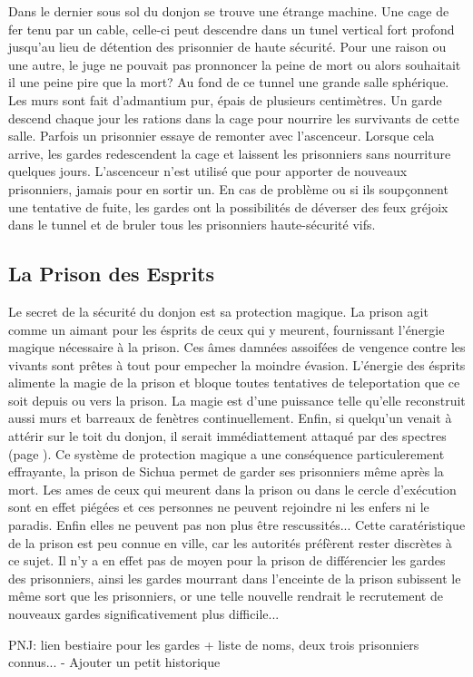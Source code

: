 Dans le dernier sous sol du donjon se trouve une étrange machine. Une cage de fer tenu 
par un cable, celle-ci peut descendre dans un tunel vertical fort profond
jusqu'au lieu de détention des prisonnier de haute sécurité. Pour une 
raison ou une autre, le juge ne pouvait pas pronnoncer la peine de mort
ou alors souhaitait il une peine pire que la mort? Au fond de ce tunnel une grande
salle sphérique. Les murs sont fait d'admantium pur, épais de plusieurs 
centimètres. Un garde descend chaque jour les rations dans la cage pour nourrire les 
survivants de cette salle. Parfois un prisonnier 
essaye de remonter avec l'ascenceur. Lorsque cela arrive, les gardes redescendent la cage et 
laissent les prisonniers sans nourriture quelques jours. L'ascenceur n'est utilisé
que pour apporter de nouveaux prisonniers, jamais pour en sortir un. En cas de
problème ou si ils soupçonnent une tentative de fuite, les gardes ont la possibilités 
de déverser des feux gréjoix dans le tunnel et de bruler tous les prisonniers 
haute-sécurité vifs.

\subsection{La Prison des Esprits}

Le secret de la sécurité du donjon est sa protection magique. La prison
agit comme un aimant pour les ésprits de ceux qui y meurent, fournissant
l'énergie magique nécessaire à la prison. Ces âmes damnées assoifées de vengence
contre les vivants sont prêtes à tout 
pour empecher la moindre évasion. L'énergie des ésprits alimente la magie de 
la prison et bloque toutes 
tentatives de teleportation que ce soit depuis ou vers la prison. La magie est d'une
puissance telle qu'elle reconstruit aussi murs et barreaux de fenètres
continuellement. Enfin, si quelqu'un venait à attérir sur le toit du donjon, il 
serait immédiattement attaqué par des spectres (page \pageref{Spectre}).
Ce système de protection magique a une conséquence particulerement effrayante,
la prison de Sichua permet de garder ses prisonniers même après la mort.
Les ames de
ceux qui meurent dans la prison ou dans le cercle d'exécution sont en effet piégées et
ces personnes ne peuvent rejoindre ni les enfers ni le paradis. Enfin elles ne
peuvent pas non plus être rescussités... Cette caratéristique de la prison est peu connue
en ville, car les autorités préfèrent rester discrètes à ce sujet. Il n'y a
en effet pas de moyen pour la prison de différencier les
gardes des prisonniers, ainsi les gardes mourrant dans l'enceinte de la prison
subissent le même sort que les prisonniers, or une telle nouvelle rendrait le 
recrutement de nouveaux gardes significativement plus difficile...


PNJ: lien bestiaire pour les 
gardes + liste de noms, deux trois prisonniers connus...
- Ajouter un petit historique


